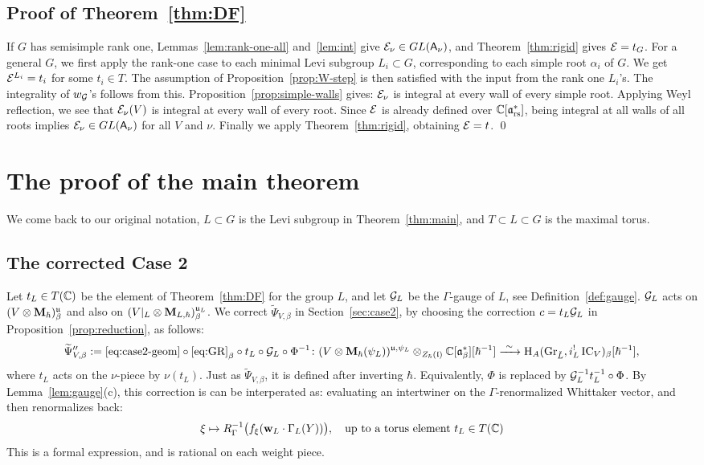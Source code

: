 \documentclass{article}
\theoremstyle{plain}
\theoremstyle{definition}
\theoremstyle{remark}
\numberwithin{equation}{section}
\begin{document}
\subsection*{Proof of Theorem~\ref{thm:DF}}\label{sec:disc-proof}
If $G$ has semisimple rank one, Lemmas~\ref{lem:rank-one-all} and~\ref{lem:int} give $\mathcal E_\nu\in GL(\mathsf A_\nu)$, and Theorem~\ref{thm:rigid} gives $\mathcal E=t_G$. For a general $G$, we first apply the rank-one case to each minimal Levi subgroup $L_i \subset G$, corresponding to each simple root $\alpha_i$ of $G$. We get $\mathcal E^{L_i} = t_i$ for some $t_i \in T$. The assumption of Proposition~\ref{prop:W-step} is then satisfied with the input from the rank one $L_i$'s. The integrality of  $w_\mathcal G$'s follows from this. Proposition~\ref{prop:simple-walls} gives: $\mathcal E_\nu$ is integral at every wall of every simple root. Applying Weyl reflection, we see that $\mathcal E_\nu (V)$ is integral at every wall of every root. Since $\mathcal E$ is already defined over $\mathbb{C}[\mathfrak{a}^*_{\mathrm{rs}}]$, being integral at all walls of all roots implies $\mathcal E_\nu\in GL(\mathsf A_\nu)$ for all $V$ and $\nu$. Finally we apply Theorem~\ref{thm:rigid}, obtaining $\mathcal E = t$. \qed


\section{The proof of the main theorem}\label{sec:gluing}
We come back to our original notation, $L\subset G$ is the Levi subgroup in Theorem~\ref{thm:main}, and $T\subset L \subset G$ is the maximal torus.

\subsection{The corrected Case 2}\label{sec:corrected}
Let $t_L\in T(\mathbb{C})$ be the element of Theorem~\ref{thm:DF} for the group $L$, and let $\mathcal G_L$ be the $\Gamma$-gauge of $L$, see Definition~\ref{def:gauge}. $\mathcal G_L$ acts on $(V\otimes\mathbf{M}_\hbar)^{\mathfrak{u}}_\beta$ and also on $(V|_L\otimes\mathbf{M}_{L,\hbar})^{\mathfrak{u}_L}_\beta$. We correct $\widetilde\Psi_{V,\beta}$ in Section~\ref{sec:case2}, by choosing the correction $c=t_L\mathcal G_L$ in Proposition~\ref{prop:reduction}, as follows:
\begin{equation}\label{eq:PsiB-corrected}
\widetilde\Psi''_{V,\beta}:=\eqref{eq:case2-geom}\circ\eqref{eq:GR}_\beta\circ t_L\circ\calG_L\circ\Phi^{-1}\colon(V\otimes\bM_\hbar(\psiL))^{\fraku,\psiL}\otimes_{\Zh(\frakl)}\Cbe[\hbar^{-1}]\xrightarrow{\ \sim\ }\H_A(\GrL,i_L^!\IC_V)_\beta[\hbar^{-1}] ,
\end{equation}
where $t_L$ acts on the $\nu$-piece by $\nu(t_L)$. Just as $\widetilde\Psi_{V,\beta}$, it is defined after inverting $\hbar$. Equivalently, $\Phi$ is replaced by $\mathcal G_L^{-1}t_L^{-1}\circ\Phi$. By Lemma~\ref{lem:gauge}(c), this correction is can be interperated as: evaluating an intertwiner on the $\Gamma$-renormalized Whittaker vector, and then renormalizes back:
\[ \xi\mapsto R_\Gamma^{-1}\bigl(f_\xi(\mathbf w_L\cdot\Gamma_L(Y))\bigr), \quad \text{up to a torus element}\, \,t_L \in T(\mathbb{C})
\]
This is a formal expression, and is rational on each weight piece.
\end{document}
